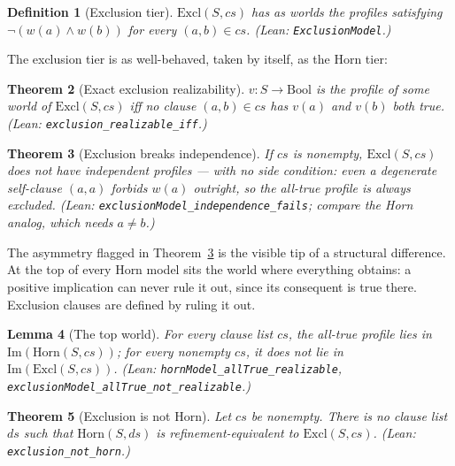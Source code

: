 \documentclass[10pt, letterpaper]{article}
\newtheorem{theorem}{Theorem}[section]
\newtheorem{lemma}[theorem]{Lemma}
\newtheorem{definition}[theorem]{Definition}
\theoremstyle{remark}
\newcommand{\lean}[1]{\texttt{#1}}
\begin{document}
\begin{definition}[Exclusion tier]\label{def:exclusion}
$\mathrm{Excl}(S, \mathit{cs})$ has as worlds the profiles satisfying
$\neg(w(a) \wedge w(b))$ for every $(a, b) \in \mathit{cs}$. (Lean:
\lean{ExclusionModel}.)
\end{definition}

The exclusion tier is as well-behaved, taken by itself, as the Horn tier:

\begin{theorem}[Exact exclusion realizability]\label{thm:excl-boundary}
$v : S \to \mathrm{Bool}$ is the profile of some world of
$\mathrm{Excl}(S, \mathit{cs})$ iff no clause $(a, b) \in \mathit{cs}$ has
$v(a)$ and $v(b)$ both true. (Lean: \lean{exclusion\_realizable\_iff}.)
\end{theorem}

\begin{theorem}[Exclusion breaks independence]\label{thm:excl-indep}
If $\mathit{cs}$ is nonempty, $\mathrm{Excl}(S, \mathit{cs})$ does not have
independent profiles --- with no side condition: even a degenerate
self-clause $(a, a)$ forbids $w(a)$ outright, so the all-true profile is
always excluded. (Lean: \lean{exclusionModel\_independence\_fails}; compare
the Horn analog, which needs $a \neq b$.)
\end{theorem}

The asymmetry flagged in Theorem~\ref{thm:excl-indep} is the visible tip of
a structural difference. At the top of every Horn model sits the world where
everything obtains: a positive implication can never rule it out, since its
consequent is true there. Exclusion clauses are defined by ruling it out.

\begin{lemma}[The top world]\label{lem:top}
For every clause list $\mathit{cs}$, the all-true profile lies in
$\mathrm{Im}(\mathrm{Horn}(S, \mathit{cs}))$; for every \emph{nonempty}
$\mathit{cs}$, it does not lie in $\mathrm{Im}(\mathrm{Excl}(S, \mathit{cs}))$.
(Lean: \lean{hornModel\_allTrue\_realizable},
\lean{exclusionModel\_allTrue\_not\_realizable}.)
\end{lemma}

\begin{theorem}[Exclusion is not Horn]\label{thm:exclusion-not-horn}
Let $\mathit{cs}$ be nonempty. There is no clause list $\mathit{ds}$ such
that $\mathrm{Horn}(S, \mathit{ds})$ is refinement-equivalent to
$\mathrm{Excl}(S, \mathit{cs})$. (Lean: \lean{exclusion\_not\_horn}.)
\end{theorem}
\end{document}
